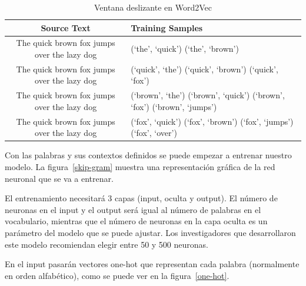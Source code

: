 \documentclass[withindex, glossary]{cam-thesis}
\begin{document}
\begin{table}
    \centering
    \begin{tabular}{cp{45mm}}
        \toprule
        Source Text & Training Samples \\
        \midrule
        \colorbox{blue!20}{\colorbox{red!20}{The} quick brown} fox jumps over the lazy dog & (`the', `quick') \newline (`the', `brown') \\
        \midrule
        \colorbox{blue!20}{The \colorbox{red!20}{quick} brown fox} jumps over the lazy dog & (`quick', `the') \newline (`quick', `brown') \newline (`quick', `fox') \\
        \midrule
        \colorbox{blue!20}{The quick \colorbox{red!20}{brown} fox jumps} over the lazy dog & (`brown', `the') \newline (`brown', `quick') \newline (`brown', `fox') \newline (`brown', `jumps') \\
        \midrule
        The \colorbox{blue!20}{quick brown \colorbox{red!20}{fox} jumps over} the lazy dog & (`fox', `quick') \newline (`fox', `brown') \newline (`fox', `jumps') \newline (`fox', `over') \\
        \bottomrule
    \end{tabular}
    \caption{Ventana deslizante en Word2Vec}\label{tab:w2v-window}
\end{table}

Con las palabras y sus contextos definidos se puede empezar a entrenar nuestro modelo. La figura~\ref{skip-gram} muestra una representación gráfica de la red neuronal que se va a entrenar.

El entrenamiento necesitará 3 capas (input, oculta y output). El número de neuronas en el input y el output será igual al número de palabras en el vocabulario, mientras que el número de neuronas en la capa oculta es un parámetro del modelo que se puede ajustar. Los investigadores que desarrollaron este modelo recomiendan elegir entre 50 y 500 neuronas\cite{DBLP:journals/corr/abs-1301-3781}.

En el input pasarán vectores \gls{one-hot} que representan cada palabra (normalmente en orden alfabético), como se puede ver en la figura~\ref{one-hot}.
\end{document}
